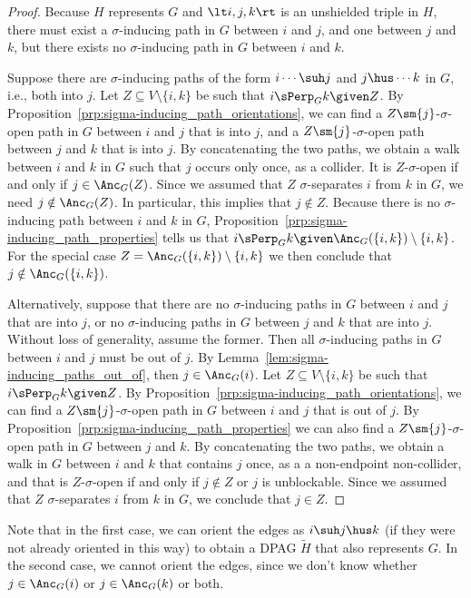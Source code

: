 \begin{proof}
  Because $H$ represents $G$ and $\lt i,j,k \rt$ is an unshielded triple in $H$, there must exist a $\sigma$-inducing path in $G$ between $i$ and $j$, and one between $j$ and $k$, but there exists no $\sigma$-inducing path in $G$ between $i$ and $k$.

  Suppose there are $\sigma$-inducing paths of the form $i \cdots \suh j$ and $j \hus \cdots k$ in $G$, i.e., both into $j$. 
  Let $Z \subseteq V \setminus \{i,k\}$ be such that $i \sPerp_G k \given Z$.
  By Proposition~\ref{prp:sigma-inducing_path_orientations}, we can find a $Z \sm \{j\}$-$\sigma$-open path in $G$ between $i$ and $j$ that is into $j$, and a $Z \sm \{j\}$-$\sigma$-open path between $j$ and $k$ that is into $j$.
  By concatenating the two paths, we obtain a walk between $i$ and $k$ in $G$ such that $j$ occurs only once, as a collider. 
  It is $Z$-$\sigma$-open if and only if $j \in \Anc_G(Z)$.
  Since we assumed that $Z$ $\sigma$-separates $i$ from $k$ in $G$, we need $j \notin \Anc_G(Z)$.
  In particular, this implies that $j \notin Z$.
  Because there is no $\sigma$-inducing path between $i$ and $k$ in $G$, Proposition~\ref{prp:sigma-inducing_path_properties} tells us that $i \sPerp_G k \given \Anc_G(\{i,k\}) \setminus \{i,k\}$.
  For the special case $Z = \Anc_G(\{i,k\}) \setminus \{i,k\}$ we then conclude that $j \notin \Anc_G(\{i,k\})$.

  Alternatively, suppose that there are no $\sigma$-inducing paths in $G$ between $i$ and $j$ that are into $j$, or no $\sigma$-inducing paths in $G$ between $j$ and $k$ that are into $j$.
  Without loss of generality, assume the former.
  Then all $\sigma$-inducing paths in $G$ between $i$ and $j$ must be out of $j$.
  By Lemma~\ref{lem:sigma-inducing_paths_out_of}, then $j \in \Anc_G(i)$.
  Let $Z \subseteq V \setminus \{i,k\}$ be such that $i \sPerp_G k \given Z$.
  By Proposition~\ref{prp:sigma-inducing_path_orientations}, we can find a $Z \sm \{j\}$-$\sigma$-open path in $G$ between $i$ and $j$ that is out of $j$.
  By Proposition~\ref{prp:sigma-inducing_path_properties} we can also find a $Z \sm \{j\}$-$\sigma$-open path in $G$ between $j$ and $k$.
  By concatenating the two paths, we obtain a walk in $G$ between $i$ and $k$ that contains $j$ once, as a a non-endpoint non-collider, and that is $Z$-$\sigma$-open if and only if $j \notin Z$ or $j$ is unblockable.
  Since we assumed that $Z$ $\sigma$-separates $i$ from $k$ in $G$,
  we conclude that $j \in Z$.
\end{proof}
Note that in the first case, we can orient the edges as $i \suh j \hus k$ (if they were not already oriented in this way) to obtain a DPAG $\tilde{H}$ that also represents $G$. 
In the second case, we cannot orient the edges, since we don't know whether $j \in \Anc_G(i)$ or $j \in \Anc_G(k)$ or both.

